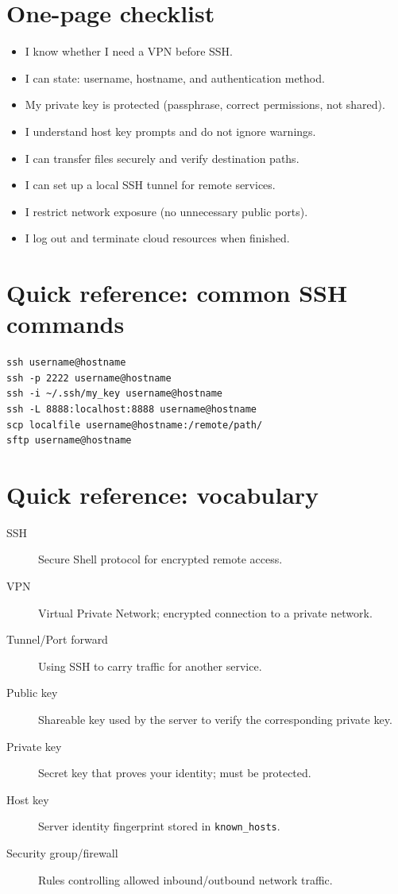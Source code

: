 \section{One-page checklist}
\begin{itemize}
\item I know whether I need a VPN before SSH.
\item I can state: username, hostname, and authentication method.
\item My private key is protected (passphrase, correct permissions, not shared).
\item I understand host key prompts and do not ignore warnings.
\item I can transfer files securely and verify destination paths.
\item I can set up a local SSH tunnel for remote services.
\item I restrict network exposure (no unnecessary public ports).
\item I log out and terminate cloud resources when finished.
\end{itemize}

\section{Quick reference: common SSH commands}
\begin{verbatim}
ssh username@hostname
ssh -p 2222 username@hostname
ssh -i ~/.ssh/my_key username@hostname
ssh -L 8888:localhost:8888 username@hostname
scp localfile username@hostname:/remote/path/
sftp username@hostname
\end{verbatim}

\section{Quick reference: vocabulary}
\begin{description}
\item[SSH] Secure Shell protocol for encrypted remote access.
\item[VPN] Virtual Private Network; encrypted connection to a private network.
\item[Tunnel/Port forward] Using SSH to carry traffic for another service.
\item[Public key] Shareable key used by the server to verify the corresponding private key.
\item[Private key] Secret key that proves your identity; must be protected.
\item[Host key] Server identity fingerprint stored in \texttt{known_hosts}.
\item[Security group/firewall] Rules controlling allowed inbound/outbound network traffic.
\end{description}
